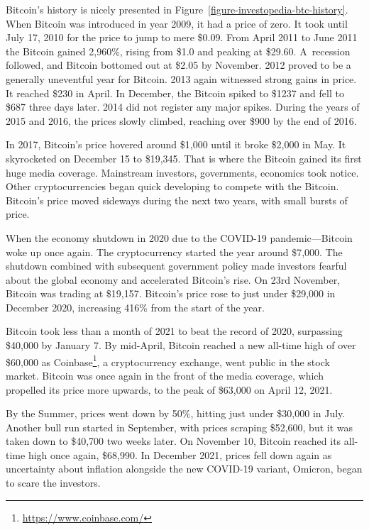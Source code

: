 Bitcoin's history is nicely presented in Figure~\ref{figure-investopedia-btc-history}. When Bitcoin was introduced in year 2009, it had a price of zero. It took until July 17, 2010 for the price to jump to mere \$0.09. From April 2011 to June 2011 the Bitcoin gained 2,960\%, rising from \$1.0 and peaking at \$29.60. A~recession followed, and Bitcoin bottomed out at \$2.05 by November. 2012 proved to be a generally uneventful year for Bitcoin. 2013 again witnessed strong gains in price. It reached \$230 in April. In December, the Bitcoin spiked to \$1237 and fell to \$687 three days later. 2014 did not register any major spikes. During the years of 2015 and 2016, the prices slowly climbed, reaching over \$900 by the end of 2016.

In 2017, Bitcoin's price hovered around \$1,000 until it broke \$2,000 in May. It skyrocketed on December 15 to \$19,345. That is where the Bitcoin gained its first huge media coverage. Mainstream investors, governments, economics took notice. Other cryptocurrencies began quick developing to compete with the Bitcoin. Bitcoin's price moved sideways during the next two years, with small bursts of price.

When the economy shutdown in 2020 due to the COVID-19 pandemic---Bitcoin woke up once again. The cryptocurrency started the year around \$7,000. The shutdown combined with subsequent government policy made investors fearful about the global economy and accelerated Bitcoin's rise. On 23rd November, Bitcoin was trading at \$19,157. Bitcoin's price rose to just under \$29,000 in December 2020, increasing 416\% from the start of the year.

Bitcoin took less than a month of 2021 to beat the record of 2020, surpassing \$40,000 by January 7. By mid-April, Bitcoin reached a new all-time high of over \$60,000 as Coinbase\footnote{\url{https://www.coinbase.com/}}, a cryptocurrency exchange, went public in the stock market. Bitcoin was once again in the front of the media coverage, which propelled its price more upwards, to the peak of \$63,000 on April 12, 2021.

By the Summer, prices went down by 50\%, hitting just under \$30,000 in July. Another bull run started in September, with prices scraping \$52,600, but it was taken down to \$40,700 two weeks later. On November 10, Bitcoin reached its all-time high once again, \$68,990. In December 2021, prices fell down again as uncertainty about inflation alongside the new COVID-19 variant, Omicron, began to scare the investors.

